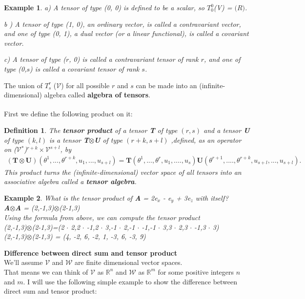 \documentclass[12pt,a4paper]{article}
\newtheorem{defn}[thm]{Definition}
\newtheorem{exmp}{Example}[section]
\begin{document}
\begin{exmp}
\item[a)]A tensor of type (0, 0) is defined to be a scalar, so $T^0_0$(V) = $\mathbb(R)$.
\item[b]) A tensor of type (1, 0), an ordinary vector, is called a contravariant vector, and one
of type (0, 1), a dual vector (or a linear functional), is called a covariant
vector.
\item[c)] A tensor of type ($r$, 0) is called a contravariant tensor of rank $r$,
and one of type (0,$s$) is called a covariant tensor of rank $s$.
\end{exmp}
The union of $T^r_s$ ($\mathcal{V}$) for all possible $r$ and $s$ can be made into an (infinite-dimensional) algebra called \textbf{algebra of tensors}.\\\\
First we define the following product on it:
\begin{defn}
The \textbf{tensor product} of a tensor \textbf{T} of type $(r, s)$ and a tensor \textbf{U} of type $(k, l)$ is a tensor \textbf{T}$\otimes$\textbf{U} of type $(r+k, s+l)$ ,defined, as an operator on ($\mathcal{V}$$^*$)$^{r+k}\times \mathcal{V}^{s+l}$, by 
\begin{align*}
(\textbf{T}\otimes\textbf{U})(\theta^1,...,\theta^{r+k},u_1,...,u_{s+l}) = \textbf{T}(\theta^1,...,\theta^r,u_1,....,u_s)\textbf{U}(\theta^{r+1},....,\theta^{r+k},u_{s+l},...,u_{s+l}).
\end{align*}
This product turns the (infinite-dimensional) vector space of all tensors into an associative algebra called a \textbf{tensor algebra}.
\end{defn}
\begin{exmp}
What is the tensor product of \textbf{A} = 2e$_x$ - e$_y$ + 3e$_z$ with itself?\\
\textbf{A}$\otimes$\textbf{A} = (2,-1,3)$\otimes$(2-1,3)\\
Using the formula from above, we can compute the tensor product\\
(2,-1,3)$\otimes$(2-1,3)=(2 $\cdot$ 2,2 $\cdot$ -1,2 $\cdot$ 3,-1 $\cdot$ 2,-1 $\cdot$ -1,-1 $\cdot$ 3,3 $\cdot$ 2,3 $\cdot$ -1,3 $\cdot$ 3)\\
(2,-1,3)$\otimes$(2-1,3) = (4, -2, 6, -2, 1, -3, 6, -3, 9)

\end{exmp}
\textbf{Difference between direct sum and tensor product}\\
We'll assume $\mathcal{V}$ and $\mathcal{W}$ are finite dimensional vector spaces. \\That means we can think of $\mathcal{V}$ as $\mathbb{R}^n$ and $\mathcal{W}$ as $\mathbb{R}^m$ for some positive integers $n$ and $m$. I will use the following simple example to show the difference between direct sum and tensor product:\\
\end{document}
